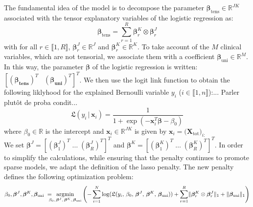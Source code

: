 \documentclass[10pt]{article}
\begin{document}
\noindent The fundamental idea of the model is to decompose the parameter $\bm{\beta}_{\text{tens}} \in \mathbb{R}^{JK}$ associated with the tensor explanatory variables of the logistic regression as:
\begin{equation}
\bm{\beta}_{\text{tens}} = \sum\limits_{r = 1}^R\bm{\beta}_r^K \otimes \bm{\beta}_r^J
\end{equation}
with for all $r \in \llbracket 1 ,R \rrbracket$, $\bm{\beta}_r^J \in \mathbb{R}^J$ and $\bm{\beta}_r^K \in \mathbb{R}^K$. To take account of the $M$ clinical variables, which are not tensorial, we associate them with a coefficient $\bm{\beta}_{\text{uni}} \in \mathbb{R}^M$. In this way, the parameter $\bm{\beta}$ of the logistic regression is written: $\left[(\bm{\beta_{\text{tens}}})^T \; \; \; (\bm{\beta_{\text{uni}}})^T \right]^T$. 
We then use the logit link function to obtain the following liklyhood for the explained Bernoulli variable $y_i$ ($i \in \llbracket 1, n \rrbracket$):... Parler plutôt de proba condit...
\begin{equation}
\label{eqref:vraisemblance}
\mathfrak{L}( y_i \, | \, \mathbf{x}_i) = \frac{1}{1 + \exp(- \mathbf{x}_i^T \bm{\beta} - \beta_0)}
\end{equation}
where  $\beta_0 \in \mathbb{R}$ is the intercept and $\mathbf{x}_i \in \mathbb{R}^{JK}$ is given by $\mathbf{x}_i = {(\mathbf{X}_{\text{tot}}})_{i:}$ \\

\noindent We set  $\bm{\beta}^J = \left[\left(\bm{\beta}_1^J\right)^T \; \ldots \; \left(\bm{\beta}_R^J\right)^T \right]^T$ and  $\bm{\beta}^K = \left[\left(\bm{\beta}_1^K\right)^T \; \ldots \; \left(\bm{\beta}_R^K\right)^T \right]^T$.
\vspace{5 pt}
\noindent In order to simplify the calculations, while ensuring that the penalty continues to promote sparse models, we adapt the definition of the lasso penalty. The new penalty defines the following optimization problem: %
\begin{equation}
 \beta_0, \bm{\beta}^J, \bm{\beta}^K, \bm{\beta}_{\text{uni}} \; = \hspace{-8pt} \underset{\beta_0 ,\, \bm{\beta}^J, \, \bm{\beta}^K, \, \bm{\beta}_{\text{uni}}}{\text{argmin}} \left( - \sum\limits_{i = 1}^{N} \log(\mathfrak{L}(y_i, \,\beta_0 ,\, \bm{\beta}^J, \, \bm{\beta}^K, \, \bm{\beta}_{\text{uni}})) + \sum\limits_{r = 1}^R 
    \lVert \bm{\beta}_r^K \otimes \bm{\beta}_r^J \rVert_1 + \lVert \bm{\beta}_{\text{uni}} \rVert_1 \right)
\end{equation}
\end{document}
